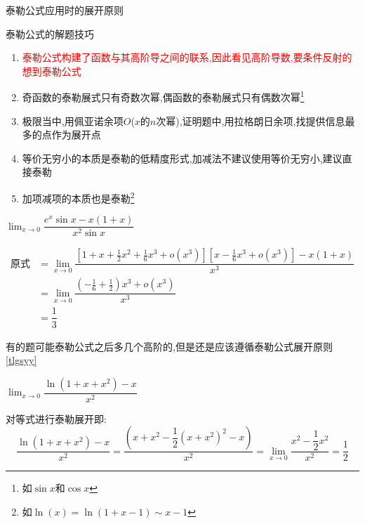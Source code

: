 \documentclass[8pt a4paper, oneside, UTF8]{ctexbook}
\begin{document}
\begin{sloppypar}
\begin{criterion}{泰勒公式应用时的展开原则\label{tlgsyy}}{}
\begin{itemize}
        \end{itemize}
    \end{criterion}
    \begin{criterion}{泰勒公式的解题技巧}{}
        \begin{enumerate}
            \item \textcolor{red}{泰勒公式构建了函数与其高阶导之间的联系,因此看见高阶导数,要条件反射的想到泰勒公式}
            \item 奇函数的泰勒展式只有奇数次幂,偶函数的泰勒展式只有偶数次幂\footnote{如$\sin x$和$\cos x$}
            \item 极限当中,用佩亚诺余项$O$($x$的$n$次幂),证明题中,用拉格朗日余项,找提供信息最多的点作为展开点
            \item 等价无穷小的本质是泰勒的低精度形式,加减法不建议使用等价无穷小,建议直接泰勒
            \item 加项减项的本质也是泰勒\footnote{如$\ln(x)=\ln(1+x-1)\sim x-1$}
        \end{enumerate}
    \end{criterion}
    \begin{problem}
    $\lim_{x\to 0}\dfrac{e^x \sin x-x(1+x)}{x^2\sin x}$
    \end{problem}
    \begin{solution}
        \begin{align*}
            \text{原式} & = \lim_{x \to 0} \dfrac{\left[1+x+\frac12x^2+\frac16x^3+o(x^3)\right]\left[x-\frac16x^3+o(x^3)\right]-x(1+x)}{x^3} \\
                      & = \lim_{x\to0}\dfrac{\left(-\frac{1}{6}+\frac{1}{2}\right)x^3+o\left(x^3\right)}{x^3}                              \\
                      & = \dfrac13
        \end{align*}
    \end{solution}
    \begin{note}
        有的题可能泰勒公式之后多几个高阶的,但是还是应该遵循泰勒公式展开原则\ref{tlgsyy}
    \end{note}
    \begin{problem}
    $\lim_{x\to0}\dfrac{\ln\left(1+x+x^{2}\right)-x}{x^{2}}$
    \end{problem}
    \begin{solution}
        对等式进行泰勒展开即:$$\dfrac{\ln(1+x+x^2)-x}{x^2}=\dfrac{(x+x^2-\dfrac{1}{2}(x+x^2)^2-x)}{x^2}=\lim_{x \to 0}\dfrac{x^2-\dfrac{1}{2}x^2}{x^2}=\dfrac{1}{2}$$
    \end{solution}
    \begin{problem}

\end{problem}
\end{sloppypar}
\end{document}
